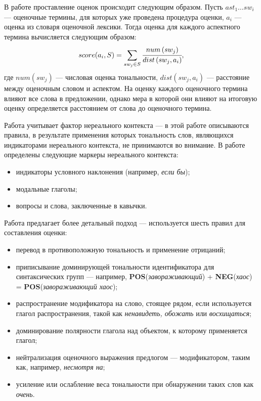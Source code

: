 В работе \cite{negation} проставление оценок происходит следующим образом. Пусть $ast_1 \dots sw_i$ --- оценочные термины, для которых уже проведена процедура оценки, $a_i$ --- оценка из словаря оценочной лексики. Тогда оценка для каждого аспектного термина вычисляется следующим образом: 
\begin{equation}
	score(a_i, S) = \sum_{sw_j \in S}\cfrac{num\left(sw_j\right)}{dist\left( sw_j, a_i\right)},
\end{equation}
где $num\left(sw_j\right)$ --- числовая оценка тональности, $dist\left( sw_j, a_i\right)$ --- расстояние между оценочным словом и аспектом. На оценку каждого оценочного термина влияют все слова в предложении, однако мера в которой они влияют на итоговую оценку определяется расстоянием от слова до оценочного термина. 

Работа \cite{modf} учитывает фактор нереального контекста --- в этой работе описываются правила, в результате применения которых тональность слов, являющихся индикаторами нереального контекста, не принимаются во внимание. В работе определены следующие маркеры нереального контекста: 
\begin{itemize}
	\item индикаторы условного наклонения (например, \textit{если бы});
	\item модальные глаголы;
	\item вопросы и слова, заключенные в кавычки.
\end{itemize}

Работа \cite{8pattrns} предлагает более детальный подход --- используется шесть правил для составления оценки:
\begin{itemize}
	\item перевод в противоположную тональность и применение отрицаний;
	\item приписывание доминирующей тональности идентификатора для синтаксических групп --- например, \textbf{POS}(\textit{завораживающий}) + \textbf{NEG}(\textit{хаос}) \\ = \textbf{POS}(\textit{завораживающий хаос});
	\item распространение модификатора на слово, стоящее рядом, если используется глагол распространения, такой как \textit{ненавидеть, обожать} или \textit{восхищаться};
	\item доминирование полярности глагола над объектом, к которому применяется глагол;
	\item нейтрализация оценочного выражения предлогом --- модификатором, таким как, например, \textit{несмотря на};
	\item усиление или ослабление веса тональности при обнаружении таких слов как \textit{очень}.
\end{itemize}

